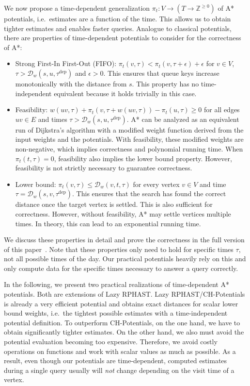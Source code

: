\documentclass[a4paper,UKenglish,cleveref, autoref, thm-restate]{lipics-v2021}
\newcommand*{\dist}{\mathcal{D}}
\newcommand*{\tdep}{\tau^{\operatorname{dep}}}
\begin{document}
We now propose a time-dependent generalization $\pi_t : V \to (T \to \mathbb{Z}^{\geq 0})$ of A* potentials, i.e.\ estimates are a function of the time.
This allows us to obtain tighter estimates and enables faster queries.
Analogue to classical potentials, there are properties of time-dependent potentials to consider for the correctness of A*:
\begin{itemize}
  \item Strong First-In First-Out (FIFO): $\pi_t(v, \tau) < \pi_t(v, \tau + \epsilon) + \epsilon$ for $v \in V$, $\tau > \dist_w(s,u,\tdep)$ and $\epsilon > 0$.
        This ensures that queue keys increase monotonically with the distance from $s$.
        This property has no time-independent equivalent because it holds trivially in this case.
  \item Feasibility: $w(uv, \tau) + \pi_t(v, \tau + w(uv, \tau)) - \pi_t(u, \tau) \geq 0$ for all edges $uv \in E$ and times $\tau > \dist_w(s,u,\tdep)$.
        A* can be analyzed as an equivalent run of Dijkstra's algorithm with a modified weight function derived from the input weights and the potentials.
        With feasibility, these modified weights are non-negative, which implies correctness and polynomial running time.
        When $\pi_t(t, \tau) = 0$, feasibility also implies the lower bound property.
        However, feasibility is not strictly necessary to guarantee correctness.
  \item Lower bound: $\pi_t(v, \tau) \leq \dist_w(v,t,\tau)$ for every vertex $v \in V$ and time $\tau = \dist_w(s,v,\tdep)$.
        This ensures that the search has found the correct distance once the target vertex is settled.
        This is also sufficient for correctness.
        However, without feasibility, A* may settle vertices multiple times.
        In theory, this can lead to an exponential running time.
\end{itemize}

We discuss these properties in detail and prove the correctness in the full version of this paper~\cite{wz-cplttdap-22}.
Note that these properties only need to hold for specific times $\tau$, not all possible times of the day.
Our practical potentials heavily rely on this and only compute data for the specific times necessary to answer a query correctly.

In the following, we present two practical realizations of time-dependent A* potentials.
Both are extensions of Lazy RPHAST.
Lazy RPHAST/CH-Potentials is already a very efficient potential and obtains exact distances for scalar lower bound weights, i.e.\ the tightest possible estimates with a time-independent potential definition.
To outperform CH-Potentials, on the one hand, we have to obtain significantly tighter estimates.
On the other hand, we also must avoid the potential evaluation becoming too expensive.
Therefore, we avoid costly operations on functions and work with scalar values as much as possible.
As a result, even though our potentials are time-dependent, computed estimates during a single query usually will \emph{not} change depending on the visit time of a vertex.
\end{document}
